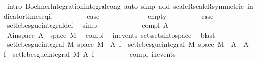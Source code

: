 \begin{isabellebody}
\ {\isacharparenleft}{\kern0pt}intro\ Bochner{\isacharunderscore}{\kern0pt}Integration{\isachardot}{\kern0pt}integral{\isacharunderscore}{\kern0pt}cong{\isacharcomma}{\kern0pt}\ auto\ simp\ add{\isacharcolon}{\kern0pt}\ scaleR{\isacharunderscore}{\kern0pt}scaleR{\isacharbrackleft}{\kern0pt}symmetric{\isacharbrackright}{\kern0pt}\ indicator{\isacharunderscore}{\kern0pt}times{\isacharunderscore}{\kern0pt}eq{\isacharunderscore}{\kern0pt}if{\isacharparenleft}{\kern0pt}{}{\isacharparenright}{\kern0pt}{\isacharparenright}{\kern0pt}\isanewline
\ \ \ \ \ \ \isamarkupfalse%
\ \isamarkupfalse%
\ {\isacharquery}{\kern0pt}case\ \isacommand{{\isachardot}{\kern0pt}}\isamarkupfalse%
\isanewline
\ \ \ \ \isamarkupfalse%
\isanewline
\ \ \ \ \ \ \isamarkupfalse%
\ empty\isanewline
\ \ \ \ \ \ \isamarkupfalse%
\ \isamarkupfalse%
\ {\isacharquery}{\kern0pt}case\ \isamarkupfalse%
\ set{\isacharunderscore}{\kern0pt}lebesgue{\isacharunderscore}{\kern0pt}integral{\isacharunderscore}{\kern0pt}def\ \isamarkupfalse%
\ simp\isanewline
\ \ \ \ \isamarkupfalse%
\isanewline
\ \ \ \ \ \ \isamarkupfalse%
\ {\isacharparenleft}{\kern0pt}compl\ A{\isacharparenright}{\kern0pt}\isanewline
\ \ \ \ \ \ \isamarkupfalse%
\ A{\isacharunderscore}{\kern0pt}in{\isacharunderscore}{\kern0pt}space{\isacharcolon}{\kern0pt}\ {\isachardoublequoteopen}A\ {\isasymsubseteq}\ space\ M{\isachardoublequoteclose}\ \isamarkupfalse%
\ compl\ \isamarkupfalse%
\ in{\isacharunderscore}{\kern0pt}events\ sets{\isachardot}{\kern0pt}sets{\isacharunderscore}{\kern0pt}into{\isacharunderscore}{\kern0pt}space\ \isamarkupfalse%
\ blast\isanewline
\ \ \ \ \ \ \isamarkupfalse%
\ {\isachardoublequoteopen}set{\isacharunderscore}{\kern0pt}lebesgue{\isacharunderscore}{\kern0pt}integral\ M\ {\isacharparenleft}{\kern0pt}space\ M\ {\isacharminus}{\kern0pt}\ A{\isacharparenright}{\kern0pt}\ f\ {\isacharequal}{\kern0pt}\ set{\isacharunderscore}{\kern0pt}lebesgue{\isacharunderscore}{\kern0pt}integral\ M\ {\isacharparenleft}{\kern0pt}space\ M\ {\isacharminus}{\kern0pt}\ A\ {\isasymunion}\ A{\isacharparenright}{\kern0pt}\ f\ {\isacharminus}{\kern0pt}\ set{\isacharunderscore}{\kern0pt}lebesgue{\isacharunderscore}{\kern0pt}integral\ M\ A\ f{\isachardoublequoteclose}\isanewline
\ \ \ \ \ \ \ \ \isamarkupfalse%
\ compl{\isacharparenleft}{\kern0pt}{}{\isacharparenright}{\kern0pt}\ in{\isacharunderscore}{\kern0pt}events\isanewline

\end{isabellebody}

